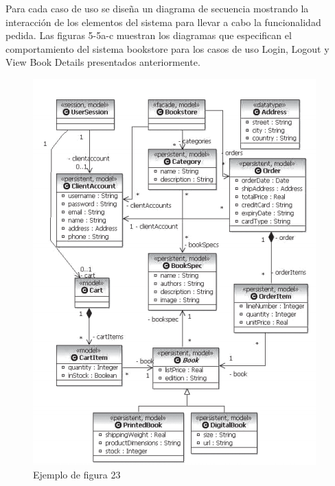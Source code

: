 Para cada caso de uso se diseña un diagrama de secuencia mostrando la interacción de los elementos del sistema para llevar a cabo la funcionalidad pedida. Las figuras 5-5a-c muestran los diagramas que especifican el comportamiento del sistema bookstore para los casos de uso Login, Logout y View Book Details presentados anteriormente.

\begin{figure}[H]
\centering
\includegraphics[scale=0.9]{./Imagenes/modelo23}
\caption{Ejemplo de figura 23}
\label{figura23}
\end{figure}
